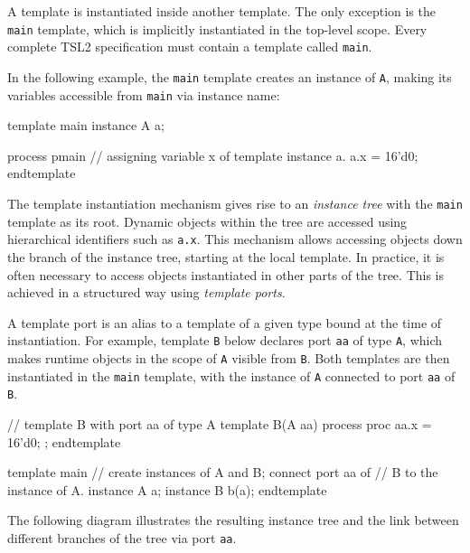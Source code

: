 \documentclass{report}
\newcommand{\src}[1]{\texttt{#1}}
\newcommand{\tsl}{TSL2 }
\begin{document}
A template is instantiated inside another template.  The only 
exception is the \src{main} template, which is implicitly 
instantiated in the top-level scope.  Every complete \tsl 
specification must contain a template called \src{main}.  

In the following example, the \src{main} template creates an 
instance of \src{A}, making its variables accessible from 
\src{main} via instance name:
\begin{tsllisting}{}
template main
  instance A a;

  process pmain {
    // assigning variable x of template instance a.
    a.x = 16'd0;
  }
endtemplate
\end{tsllisting}

The template instantiation mechanism gives rise to an 
\emph{instance tree} with the \src{main} template as its root.  
Dynamic objects within the tree are accessed using hierarchical 
identifiers such as \src{a.x}.  This mechanism allows accessing 
objects down the branch of the instance tree, starting at the 
local template.  In practice, it is often necessary to access 
objects instantiated in other parts of the tree.  This is achieved 
in a structured way using \emph{template ports}.  

A template port is an alias to a template of a given type bound at 
the time of instantiation.  For example, template \src{B} below 
declares port \src{aa} of type \src{A}, which makes runtime 
objects in the scope of \src{A} visible from \src{B}.  Both 
templates are then instantiated in the \src{main} template, with 
the instance of \src{A} connected to port \src{aa} of \src{B}.
\begin{tsllisting}{}
// template B with port aa of type A
template B(A aa)
  process proc {
    aa.x = 16'd0;
  };
endtemplate

template main
  // create instances of A and B; connect port aa of
  // B to the instance of A.
  instance A a;
  instance B b(a);
endtemplate
\end{tsllisting}

The following diagram illustrates the resulting instance tree and 
the link between different branches of the tree via port \src{aa}.

\end{document}
